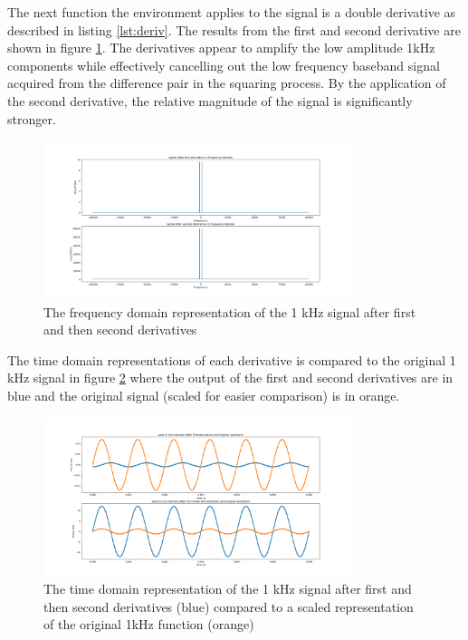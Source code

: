 The next function the environment applies to the signal is a double derivative as described in listing \ref{lst:deriv}. The results from the first and second derivative are shown in figure \ref{fig:dt12simfft}.
The derivatives appear to amplify the low amplitude 1kHz components while effectively cancelling out the low frequency baseband signal acquired from the difference pair in the squaring process. By the application of the second derivative, the relative magnitude of the signal is significantly stronger.
\begin{figure}[ht!]
    \centering
    \includegraphics[width=0.8\textwidth]{Figures/SigSimulation/dt1dt2fft.png}
    \caption{The frequency domain representation of the 1 kHz signal after first and then second derivatives}
    \label{fig:dt12simfft}
\end{figure}
\newpage
The time domain representations of each derivative is compared to the original 1 kHz signal in figure \ref{fig:dt_tdom} where the output of the first and second derivatives are in blue and the original signal (scaled for easier comparison) is in orange. 
\begin{figure}[ht!]
    \centering
    \includegraphics[width=0.8\textwidth]{Figures/SigSimulation/dt1vorig1div500_dt2vorig1div10.png}
    \caption{The time domain representation of the 1 kHz signal after first and then second derivatives (blue) compared to a scaled representation of the original 1kHz function (orange)}
    \label{fig:dt_tdom}
\end{figure}
